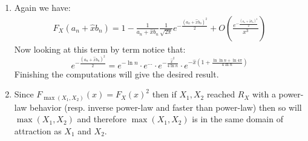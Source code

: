 \documentclass[10pt,a4paper]{book}
\begin{document}
\begin{enumerate}
\item Again we have:
\begin{align*}
F_X(a_n + \hat{x} b_n) = 1 - \frac{1}{a_n + \hat{x} b_n} \frac{1}{\sqrt{2 \pi}} e^{- \frac{(a_n + \hat{x} b_n)^2}{2}} + O\left( \frac{e^{-\frac{(a_n + \hat{x} b_n)^2}{2}}}{x^3} \right)
\end{align*}
Now looking at this term by term notice that:
\[
e^{-\frac{(a_n + \hat{x} b_n)^2}{2}} = e^{- \ln n} \cdot e^{...} \cdot e^{- \frac{\hat{x}^2}{4 \ln n}} \cdot e^{- \hat{x} (1 + \frac{\ln\ln n + \ln 4 \pi}{4 \ln n})}
\]
Finishing the computations will give the desired result.

\item Since $F_{\max(X_1, X_2)}(x) = F_X(x)^2$ then if $X_1, X_2$ reached $R_X$ with a power-law behavior (resp. inverse power-law and faster than power-law) then so will $\max(X_1, X_2)$ and therefore $\max(X_1, X_2)$ is in the same domain of attraction as $X_1$ and $X_2$. 

\end{enumerate}
\end{document}
